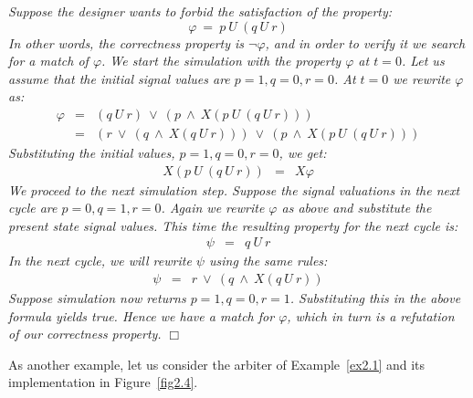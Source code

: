\begin{example}
{\em
Suppose the designer wants to forbid the satisfaction of the property:
\[ \varphi\ =\ p\ U\ (q\ U\ r) \]
\noindent
In other words, the correctness property is $\neg \varphi$, and in order to
verify it we search for a match of $\varphi$. We start the simulation with
the property $\varphi$ at $t=0$. Let us assume that the initial signal values
are $p=1, q=0, r=0$. At $t=0$ we rewrite $\varphi$ as:
\begin{eqnarray*}
\varphi & = & (q\ U\ r)\ \lor\ (p\ \land\ X(p\ U\ (q\ U\ r))) \\
& = & (r\ \lor\ (q\ \land\ X(q\ U\ r)))\ \lor\
        (p\ \land\ X(p\ U\ (q\ U\ r)))
\end{eqnarray*}
\noindent 
Substituting the initial values, $p=1, q=0, r=0$, we get:
\begin{eqnarray*}
X(p\ U\ (q\ U\ r)) & = & X \varphi
\end{eqnarray*}
\noindent
We proceed to the next simulation step. Suppose the signal valuations in the
next cycle are $p=0, q=1, r=0$. Again we rewrite $\varphi$ as above and
substitute the present state signal values. This time the resulting
property for the next cycle is:
\begin{eqnarray*}
\psi & = & q\ U\ r
\end{eqnarray*}
\noindent
In the next cycle, we will rewrite $\psi$ using the same rules:
\begin{eqnarray*}
\psi & = & r\ \lor\ (q\ \land\ X(q\ U\ r))
\end{eqnarray*}
\noindent 
Suppose simulation now returns $p=1, q=0, r=1$. Substituting this in the
above formula yields true. Hence we have a match for $\varphi$, which 
in turn is a refutation of our correctness property.
} $\Box$
\end{example}

\noindent
As another example, let us consider the arbiter of Example~\ref{ex2.1}
and its implementation in Figure~\ref{fig2.4}.

